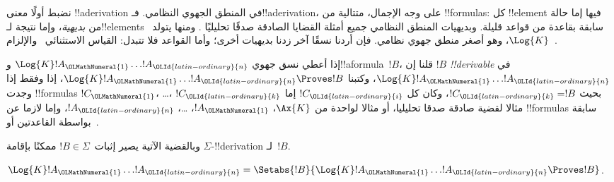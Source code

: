 \documentclass[../../../include/open-logic-section]{subfiles}
\begin{document}


نضبط أولًا معنى !!a{derivation} في المنطق الجهوي النظامي.
فـ!!a{derivation}، على وجه الإجمال، متتالية من !!{formula}s:
كل !!{element} فيها إما حالة من \emph{بديهية}، وإما نتيجة
لـ!!{element}s سابقة بقاعدة من قواعد قليلة.
وبديهيات المنطق النظامي جميع أمثلة القضايا الصادقة صدقًا تحليليًا
.
ومنها يتولد~$\Log{K}$، وهو أصغر منطق جهوي نظامي. فإن أردنا
نسقًا آخر زدنا بديهيات أخرى؛ وأما القواعد فلا تتبدل:
القياس الاستثنائي~\MP{} والإلزام~\Nec.

\begin{defn}
  إذا أعطي نسق جهوي $\Log{K} !A_{\OLMathNumeral{1}} \dots !A_{\OLId{latin-ordinary}{n}}$ و!!a{formula}~$!B$،
  قلنا إن $!B$ \emph{!!{derivable}} في $\Log{K} !A_{\OLMathNumeral{1}} \dots
  !A_{\OLId{latin-ordinary}{n}}$، وكتبنا $\Log{K} !A_{\OLMathNumeral{1}} \dots !A_{\OLId{latin-ordinary}{n}} \Proves !B$، إذا وفقط إذا
  وجدت !!{formula}s $!C_{\OLMathNumeral{1}}$، \dots، $!C_{\OLId{latin-ordinary}{k}}$ بحيث $!C_{\OLId{latin-ordinary}{k}} = !B$، وكان كل
  $!C_{\OLId{latin-ordinary}{i}}$ إما مثالا لقضية صادقة صدقا تحليليا، أو مثالا لواحدة من
  $\Ax{K}$، $!A_{\OLMathNumeral{1}}$، \dots، $!A_{\OLId{latin-ordinary}{n}}$،
  وإما لازما عن !!{formula}s سابقة بواسطة القاعدتين \MP{} أو~\Nec.
\end{defn}

وبالقضية الآتية يصير إثبات~$!B \in \Sigma$ ممكنًا بإقامة
$\Sigma$-!!{derivation} لـ~$!B$.

\begin{prop}
  $\Log{K} !A_{\OLMathNumeral{1}} \dots !A_{\OLId{latin-ordinary}{n}} = \Setabs{!B}{\Log{K} !A_{\OLMathNumeral{1}} \dots !A_{\OLId{latin-ordinary}{n}} \Proves !B}$.
\end{prop}
\end{document}
